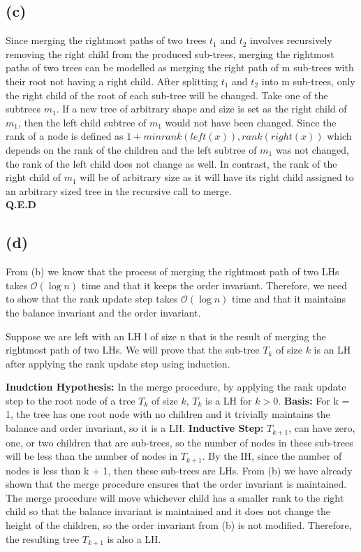     \subsection{(c)}
    Since merging the rightmost paths of two trees $t_1$ and $t_2$ involves recursively removing the right child from the produced sub-trees, merging the rightmost paths of two trees can be modelled as merging the right path of m sub-trees with their root not having a right child. After splitting $t_1$ and $t_2$ into m sub-trees, only the right child of the root of each sub-tree will be changed. Take one of the subtrees $m_1$. If a new tree of arbitrary shape and size is set as the right child of $m_1$, then the left child subtree of $m_1$ would not have been changed. Since the rank of a node is defined as $1 + min{rank(left(x)), rank(right(x))}$ which depends on the rank of the children and the left subtree of $m_1$ was not changed, the rank of the left child does not change as well. In contrast, the rank of the right child of $m_1$ will be of arbitrary size as it will have its right child assigned to an arbitrary sized tree in the recursive call to merge.\\
    \textbf{Q.E.D}

    \subsection{(d)}
    From (b) we know that the process of merging the rightmost path of two LHs takes $\mathcal{O}(\log{n})$ time and that it keeps the order invariant. Therefore, we need to show that the rank update step takes $\mathcal{O}(\log{n})$ time and that it maintains the balance invariant and the order invariant.

    Suppose we are left with an LH l of size n that is the result of merging the rightmost path of two LHs.
    We will prove that the sub-tree $T_k$ of size $k$ is an LH after applying the rank update step using induction.
    
    \textbf{Inudction Hypothesis:} In the merge procedure, by applying the rank update step to the root node of a tree $T_k$ of size $k$, $T_k$ is a LH for $k > 0$.
    \textbf{Basis:} For k = 1, the tree has one root node with no children and it trivially maintains the balance and order invariant, so it is a LH.
    \textbf{Inductive Step:} $T_{k+1}$, can have zero, one, or two children that are sub-trees, so the number of nodes in these sub-trees will be less than the number of nodes in $T_{k+1}$. By the IH, since the number of nodes is less than k + 1, then these sub-trees are LHs. From (b) we have already shown that the merge procedure ensures that the order invariant is maintained. The merge procedure will move whichever child has a smaller rank to the right child so that the balance invariant is maintained and it does not change the height of the children, so the order invariant from (b) is not modified. Therefore, the resulting tree $T_{k+1}$ is also a LH.

